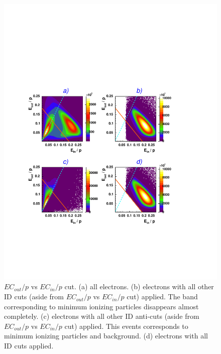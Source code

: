 \begin{figure}[h]
\begin{center}
  \includegraphics[width=12cm, bb=50 140 490 580]{data_reduction/img/ec2_pid}
  \caption[$EC_{out}/p$ vs $EC_{in}/p$ cut]
          { $EC_{out}/p$ vs $EC_{in}/p$ cut.
	     (a) all electrons.
	     (b) electrons with all other ID cuts (aside from $EC_{out}/p$ vs $EC_{in}/p$ cut) applied. 
             The band corresponding to minimum ionizing particles disappears almost completely.
             (c) electrons with all other ID 
	     anti-cuts (aside from $EC_{out}/p$ vs $EC_{in}/p$ cut) applied. 
	     This events corresponds to minimum ionizing particles and background.
             (d) electrons with all ID cuts applied.}
 \label{fig:ec2cut}
  \end{center}
\end{figure}


